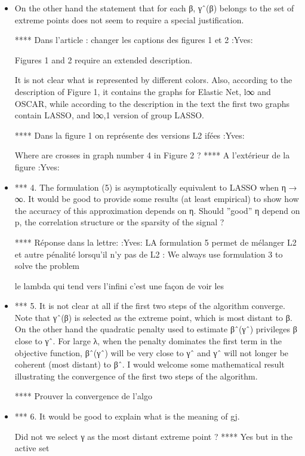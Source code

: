 \documentclass[a4paper,11pt]{texMemo}
\begin{document}
\begin{itemize}
\item 
On the other hand the statement that for each β, γˆ(β) belongs 
to the set of extreme points does not seem to require a special justification.

**** Dans l'article : changer les captions des figures 1 et 2  :Yves:

Figures 1 and 2 require an extended description.

 It is not clear what is represented by different colors.
 Also, according to the description of Figure 1,
 it contains the graphs for Elastic Net, l∞ and OSCAR, while according to the description in the text
 the first two graphs contain LASSO, and l∞,1 version of group LASSO.

**** Dans la figure 1 on représente des versions L2 ifées :Yves:

 Where are crosses in graph number 4 in Figure 2 ?
**** A l'extérieur de la figure :Yves:



\item 
*** 4. The formulation (5) is asymptotically equivalent to LASSO when η → ∞. 
It would be good to provide some results (at least empirical) 
to show how the accuracy of this approximation depends on η.
Should ”good” η depend on p, the correlation structure or the sparsity of the signal ?

****  Réponse dans la lettre:  :Yves:
LA formulation 5 permet de mélanger L2 et autre pénalité lorsqu'il n'y pas de L2 : 
We always use formulation 3 to solve the problem


le lambda qui tend vers l'infini c'est une façon de voir les


\item 
*** 5. It is not clear at all if the first two steps of the algorithm converge. 
Note that γˆ(β) is selected as the extreme point, which is most distant to β. 
On the other hand the quadratic penalty used to estimate βˆ(γˆ) privileges β close to γˆ. 
For large λ, when the penalty dominates the first term in the objective function, 
βˆ(γˆ) will be very close to γˆ and γˆ will not longer be coherent (most distant) to βˆ.
I would welcome some mathematical result illustrating the convergence of the first two steps of the algorithm.


**** Prouver la convergence de l'algo

\item 
*** 6. It would be good to explain what is the meaning of gj. 

Did not we select γ as the most distant extreme point ?
**** Yes but  in the active set


\end{itemize}
\end{document}
